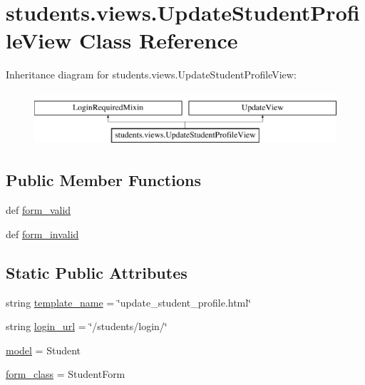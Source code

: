 \hypertarget{classstudents_1_1views_1_1_update_student_profile_view}{\section{students.\-views.\-Update\-Student\-Profile\-View Class Reference}
\label{classstudents_1_1views_1_1_update_student_profile_view}
}
Inheritance diagram for students.\-views.\-Update\-Student\-Profile\-View\-:\begin{figure}[H]
\begin{center}
\leavevmode
\includegraphics[height=2.000000cm]{classstudents_1_1views_1_1_update_student_profile_view}
\end{center}
\end{figure}
\subsection*{Public Member Functions}
\begin{DoxyCompactItemize}
\item 
def \hyperlink{classstudents_1_1views_1_1_update_student_profile_view_a102eb919b1750833c189b66b1442771b}{form\-\_\-valid}
\item 
def \hyperlink{classstudents_1_1views_1_1_update_student_profile_view_adf9774ac477073f89833c930a725280c}{form\-\_\-invalid}
\end{DoxyCompactItemize}
\subsection*{Static Public Attributes}
\begin{DoxyCompactItemize}
\item 
string \hyperlink{classstudents_1_1views_1_1_update_student_profile_view_a0104ec1afe309e798042732c2b9e4e41}{template\-\_\-name} = \char`\"{}update\-\_\-student\-\_\-profile.\-html\char`\"{}
\item 
string \hyperlink{classstudents_1_1views_1_1_update_student_profile_view_ab788cd36e6f5d47cfab8ee7d911421c6}{login\-\_\-url} = \char`\"{}/students/login/\char`\"{}
\item 
\hyperlink{classstudents_1_1views_1_1_update_student_profile_view_ad150c92fe8f6f8ed6129a2e542c60a5b}{model} = Student
\item 
\hyperlink{classstudents_1_1views_1_1_update_student_profile_view_a0b003ad3198ad35ed33d4c733ceb7f33}{form\-\_\-class} = Student\-Form
\end{DoxyCompactItemize}


